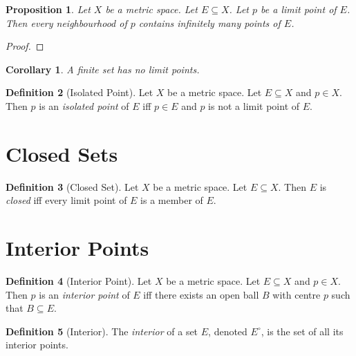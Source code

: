 \documentclass{book}
\let\qed\relax
\newtheorem{prop}{Proposition}[chapter]
\newtheorem{cor}{Corollary}[prop]
\theoremstyle{definition}
\newtheorem{df}[prop]{Definition}
\begin{document}
\begin{prop}
\label{prop:limit_point_infinite_intersection}
Let $X$ be a metric space. Let $E \subseteq X$. Let $p$ be a limit point of $E$. Then every neighbourhood of $p$ contains infinitely many points of $E$.
\end{prop}

\begin{proof}
\pf
{}
\qed
\end{proof}

\begin{cor}
\label{cor:finite_no_limit_points}
A finite set has no limit points.
\end{cor}

\begin{df}[Isolated Point]
Let $X$ be a metric space. Let $E \subseteq X$ and $p \in X$. Then $p$ is an \emph{isolated point} of $E$ iff $p \in E$ and $p$ is not a limit point of $E$.
\end{df}

\section{Closed Sets}

\begin{df}[Closed Set]
Let $X$ be a metric space. Let $E \subseteq X$. Then $E$ is \emph{closed} iff every limit point of $E$ is a member of $E$.
\end{df}

\section{Interior Points}

\begin{df}[Interior Point]
Let $X$ be a metric space. Let $E \subseteq X$ and $p \in X$. Then $p$ is an \emph{interior point} of $E$ iff there exists an open ball $B$ with centre $p$ such that $B \subseteq E$.
\end{df}

\begin{df}[Interior]
The \emph{interior} of a set $E$, denoted $E^\circ$, is the set of all its interior points.
\end{df}
\end{document}
